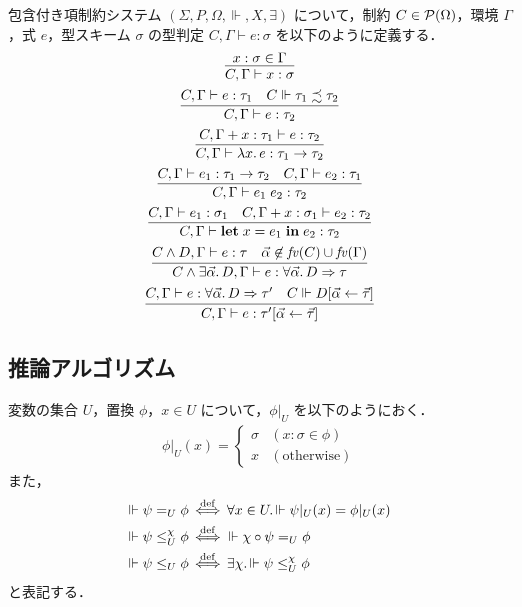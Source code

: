 \begin{definition}[型システム]
  包含付き項制約システム $(\Sigma, P, \Omega, \Vdash, X, \exists)$ について，制約 $C \in \mathcal{P}(\Omega)$，環境 $\Gamma$，式 $e$，型スキーム $\sigma$ の型判定 $C, \Gamma \vdash e: \sigma$ を以下のように定義する．
  \begin{gather*}
    \infer{C,\Gamma \vdash x:\sigma}{
      x:\sigma \in \Gamma
    }
    \\
    \infer{C,\Gamma \vdash e:\tau_2}{
      C,\Gamma \vdash e: \tau_1
      &
      C \Vdash \tau_1 \precsim \tau_2
    }
    \\
    \infer{C,\Gamma \vdash \lambda x\ldotp e: \tau_1 \to \tau_2}{
      C,\Gamma + x:\tau_1 \vdash e:\tau_2
    }
    \\
    \infer{C,\Gamma \vdash e_1\;e_2: \tau_2}{
      C,\Gamma \vdash e_1: \tau_1 \to \tau_2
      &
      C,\Gamma \vdash e_2: \tau_1
    }
    \\
    \infer{C,\Gamma \vdash \mathbf{let}\;x = e_1\;\mathbf{in}\;e_2: \tau_2}{
      C,\Gamma \vdash e_1: \sigma_1
      &
      C,\Gamma + x:\sigma_1 \vdash e_2: \tau_2
    }
    \\
    \infer{C \land \exists \vec{\alpha}\ldotp D, \Gamma \vdash e:\forall \vec{\alpha}\ldotp D \Rightarrow \tau}{
      C \land D, \Gamma \vdash e: \tau
      &
      \vec{\alpha} \not\in \mathit{fv}(C) \cup \mathit{fv}(\Gamma)
    }
    \\
    \infer{C,\Gamma \vdash e: \tau'[\vec{\alpha} \assign \vec{\tau}]}{
      C,\Gamma \vdash e: \forall \vec{\alpha}\ldotp D \Rightarrow \tau'
      &
      C \Vdash D[\vec{\alpha} \assign \vec{\tau}]
    }
  \end{gather*}
\end{definition}

\subsection{推論アルゴリズム}

\begin{definition}
  変数の集合 $U$，置換 $\phi$，$x \in U$ について，$\phi|_U$ を以下のようにおく．
  \begin{align*}
    \phi|_U(x) = \left\{\begin{array}{ll}
      \sigma &(x: \sigma \in \phi) \\
      x &(\text{otherwise})
    \end{array}\right.
  \end{align*}
  また，
  \begin{align*}
    \Vdash \psi =_U \phi &\mathop{\overset{\mathrm{def}}{\iff}} \forall x \in U\ldotp \Vdash \psi|_U(x) = \phi|_U(x) \\
    \Vdash \psi \leq_U^{\chi} \phi &\mathop{\overset{\mathrm{def}}{\iff}} \Vdash \chi \circ \psi =_U \phi \\
    \Vdash \psi \leq_U \phi &\mathop{\overset{\mathrm{def}}{\iff}} \exists \chi\ldotp \Vdash \psi \leq_U^{\chi} \phi
  \end{align*}
  と表記する．
\end{definition}


